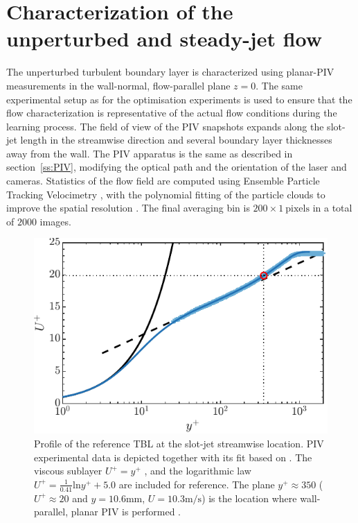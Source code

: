 \section{Characterization of the unperturbed and steady-jet flow}\label{s:Characterisation}
%
The unperturbed turbulent boundary layer is characterized using planar-PIV measurements in the wall-normal, flow-parallel plane $z = 0$. The same experimental setup as for the optimisation experiments is used to ensure that the flow characterization is representative of the actual flow conditions during the learning process. The field of view of the PIV snapshots expands along the slot-jet length in the streamwise direction and several boundary layer thicknesses away from the wall. The PIV apparatus is the same as described in section~\ref{ss:PIV}, modifying the optical path and the orientation of the laser and cameras. Statistics of the flow field are computed using Ensemble Particle Tracking Velocimetry \citep{cowen1997hybrid}, with the polynomial fitting of the particle clouds to improve the spatial resolution \citep{aguera2016EPTV}. The final averaging bin is $200\times1~\mathrm{pixels}$ in a total of $2000$ images.

\begin{figure}
    \centering
    \includegraphics[width=0.7\linewidth]{figures/F2.pdf}
    \caption{Profile of the reference TBL at the slot-jet streamwise location. PIV experimental data  is depicted together with its fit based on \citet{chauhan2009} . The viscous sublayer $U^+ = y^+$ , and the logarithmic law $U^+=\frac{1}{0.41} \mathrm{ln}y^+ + 5.0$  are included for reference. The plane $y^+\approx 350$ ($U^+\approx 20$ and $y=10.6\mathrm{mm}$, $U=10.3\mathrm{m/s}$) is the location where wall-parallel, planar PIV is performed .}
    \label{fig:TBLprofile}
\end{figure}


